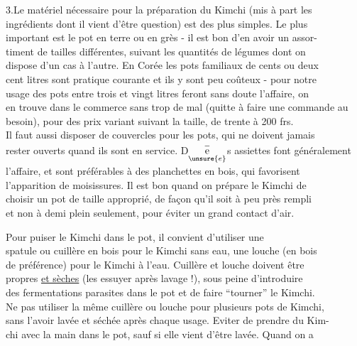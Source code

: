 3.\quad Le matériel nécessaire pour la préparation du Kimchi (mis à part les\\
ingrédients dont il vient d'être question) est des plus simples. Le plus\\
important est le pot en terre ou en grès - il est bon d'en avoir un assor-\\
timent de tailles différentes, suivant les quantités de légumes dont on\\
dispose d'un cas à l'autre. En Corée les pots familiaux de cents ou deux\\
cent litres sont pratique courante et ils y sont peu coûteux - pour notre\\
usage des pots entre trois et vingt litres feront sans doute l'affaire, on\\
en trouve dans le commerce sans trop de mal (quitte à faire une commande au\\
besoin), pour des prix variant suivant la taille, de trente à 200 frs.\\
Il faut aussi disposer de couvercles pour les pots, qui ne doivent jamais\\
rester ouverts quand ils sont en service. D$\underset{\unsure{e}}{\overset{-}{\mathrm e}}$s assiettes font généralement\\
l'affaire, et sont préférables à des planchettes en bois, qui favorisent\\
l'apparition de moisissures. Il est bon quand on prépare le Kimchi de\\
choisir un pot de taille approprié, de façon qu'il soit à peu près rempli\\
et non à demi plein seulement, pour éviter un grand contact d'air.

Pour puiser le Kimchi dans le pot, il convient d'utiliser une\\
spatule ou cuillère en bois pour le Kimchi sans eau, une louche (en bois\\
de préférence) pour le Kimchi à l'eau. Cuillère et louche doivent être\\
propres \uline{et sèches} (les essuyer après lavage !), sous peine d'introduire\\
des fermentations parasites dans le pot et de faire ``tourner'' le Kimchi.\\
Ne pas utiliser la même cuillère ou louche pour plusieurs pots de Kimchi,\\
sans l'avoir lavée et séchée après chaque usage. Eviter de prendre du Kim-\\
chi avec la main dans le pot, sauf si elle vient d'être lavée. Quand on a
